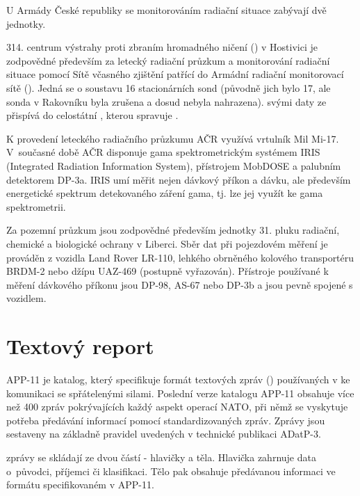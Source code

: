 U Armády České republiky se monitorováním radiační situace zabývají
dvě jednotky.
	 
314. centrum výstrahy proti zbraním hromadného ničení () v
Hostivici je zodpovědné především za letecký radiační průzkum a
monitorování radiační situace pomocí Sítě včasného zjištění patřící do
Armádní radiační monitorovací sítě (). Jedná se o
soustavu 16 stacionárních sond (původně jich bylo 17, ale sonda v
Rakovníku byla zrušena a dosud nebyla nahrazena).  svými daty
ze  přispívá do celostátní , kterou spravuje
.
	 
K provedení leteckého radiačního průzkumu AČR využívá vrtulník Mil
Mi-17. V~současné době AČR disponuje gama spektrometrickým systémem
IRIS (Integrated Radiation Information System), přístrojem MobDOSE a
palubním detektorem DP-3a. IRIS umí měřit nejen dávkový příkon a
dávku, ale především energetické spektrum detekovaného záření gama,
tj. lze jej využít ke gama spektrometrii.
	
Za pozemní průzkum jsou zodpovědné především jednotky 31. pluku
radiační, chemické a biologické ochrany v Liberci. Sběr dat při
pojezdovém měření je prováděn z vozidla Land Rover LR-110, lehkého
obrněného kolového transportéru BRDM-2 nebo džípu UAZ-469 (postupně
vyřazován). Přístroje používané k měření dávkového příkonu jsou DP-98,
AS-67 nebo DP-3b a jsou pevně spojené s vozidlem.
	 
	 
\section{Textový report}

APP-11 je katalog, který specifikuje formát textových zpráv ()
používaných v  ke komunikaci se spřátelenými silami. Poslední
verze katalogu APP-11 obsahuje více než 400 zpráv pokrývajících každý
aspekt operací NATO, při němž se vyskytuje potřeba předávání informací
pomocí standardizovaných zpráv. Zprávy jsou sestaveny na základně
pravidel uvedených v technické publikaci ADatP-3.

 zprávy se skládají ze dvou částí - hlavičky a těla. Hlavička
zahrnuje data o~původci, příjemci či klasifikaci. Tělo pak obsahuje
předávanou informaci ve formátu specifikovaném v APP-11.

